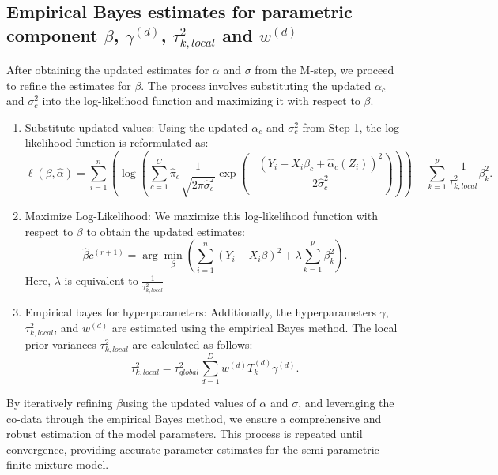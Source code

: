 \subsection{Empirical Bayes estimates for parametric component $ \beta $, $ \gamma^{(d)} $, $ \tau_{k,local}^{2} $ and $ w^{(d)} $}\label{sec:intro}
\qquad After obtaining the updated estimates for $ \alpha $ and $ \sigma $ from the M-step, we proceed to refine the estimates for $ \beta $. The process involves substituting the updated $ \alpha_{c} $ and $ \sigma^{2}_{c} $ into the log-likelihood function and maximizing it with respect to $ \beta $.
\begin{enumerate}
	\item[(1)] Substitute updated values: Using the updated $ \alpha_{c} $ and $  \sigma^{2}_{c} $ from Step 1, the log-likelihood function is reformulated as:
	\[
	 \ell(\beta, \hat{\alpha}) = \sum_{i=1}^n \left( \log \left( \sum_{c=1}^C \hat{\pi}_c \frac{1}{\sqrt{2 \pi \hat{\sigma}_c^2}} \exp \left( -\frac{(Y_i - X_i \beta_c + \hat{\alpha}_{c}(Z_{i}))^2}{2 \hat{\sigma}_c^2} \right) \right) \right) - \sum_{k=1}^{p} \frac{1}{\tau^2_{k,local}} \beta^2_k .
	 \]
	\item[(2)]	Maximize Log-Likelihood: We maximize this log-likelihood function with respect to $ \beta $ to obtain the updated estimates:
	\[ \hat{\beta}{c}^{(r+1)} = \arg \min_{\beta} \left( \sum_{i=1}^{n} (Y_i - X_i \beta)^2 + \lambda \sum_{k=1}^{p} \beta_k^2 \right) .
	\] 
	Here, $ \lambda $ is equivalent to $ \frac{1}{\tau^2_{k,local}} $
	\item[(3)] Empirical bayes for hyperparameters: Additionally, the hyperparameters $ \gamma $, $ \tau^{2}_{k, local} $, and $ w^{(d)} $ are estimated using the empirical Bayes method. The local prior variances $ \tau^{2}_{k, local} $ are calculated as follows:
	\[ \tau^{2}_{k, local} = \tau^{2}_{global} \sum_{d=1}^{D} w^{(d)} T^{(d)}_{k} \gamma^{(d)} .
	\]
\end{enumerate}
By iteratively refining $ \beta  $using the updated values of $ \alpha $ and $ \sigma $, and leveraging the co-data through the empirical Bayes method, we ensure a comprehensive and robust estimation of the model parameters. This process is repeated until convergence, providing accurate parameter estimates for the semi-parametric finite mixture model.
%
%
